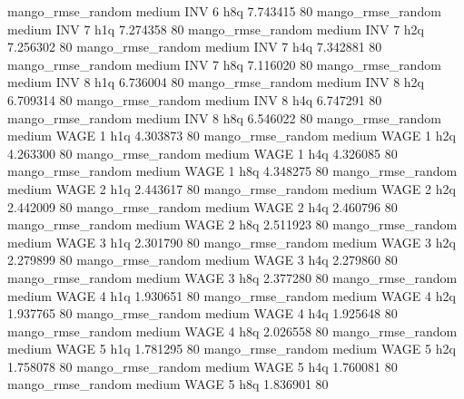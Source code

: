 mango_rmse_random     medium      INV                 6                  h8q  7.743415 80
mango_rmse_random     medium      INV                 7                  h1q  7.274358 80
mango_rmse_random     medium      INV                 7                  h2q  7.256302 80
mango_rmse_random     medium      INV                 7                  h4q  7.342881 80
mango_rmse_random     medium      INV                 7                  h8q  7.116020 80
mango_rmse_random     medium      INV                 8                  h1q  6.736004 80
mango_rmse_random     medium      INV                 8                  h2q  6.709314 80
mango_rmse_random     medium      INV                 8                  h4q  6.747291 80
mango_rmse_random     medium      INV                 8                  h8q  6.546022 80
mango_rmse_random     medium     WAGE                 1                  h1q  4.303873 80
mango_rmse_random     medium     WAGE                 1                  h2q  4.263300 80
mango_rmse_random     medium     WAGE                 1                  h4q  4.326085 80
mango_rmse_random     medium     WAGE                 1                  h8q  4.348275 80
mango_rmse_random     medium     WAGE                 2                  h1q  2.443617 80
mango_rmse_random     medium     WAGE                 2                  h2q  2.442009 80
mango_rmse_random     medium     WAGE                 2                  h4q  2.460796 80
mango_rmse_random     medium     WAGE                 2                  h8q  2.511923 80
mango_rmse_random     medium     WAGE                 3                  h1q  2.301790 80
mango_rmse_random     medium     WAGE                 3                  h2q  2.279899 80
mango_rmse_random     medium     WAGE                 3                  h4q  2.279860 80
mango_rmse_random     medium     WAGE                 3                  h8q  2.377280 80
mango_rmse_random     medium     WAGE                 4                  h1q  1.930651 80
mango_rmse_random     medium     WAGE                 4                  h2q  1.937765 80
mango_rmse_random     medium     WAGE                 4                  h4q  1.925648 80
mango_rmse_random     medium     WAGE                 4                  h8q  2.026558 80
mango_rmse_random     medium     WAGE                 5                  h1q  1.781295 80
mango_rmse_random     medium     WAGE                 5                  h2q  1.758078 80
mango_rmse_random     medium     WAGE                 5                  h4q  1.760081 80
mango_rmse_random     medium     WAGE                 5                  h8q  1.836901 80
